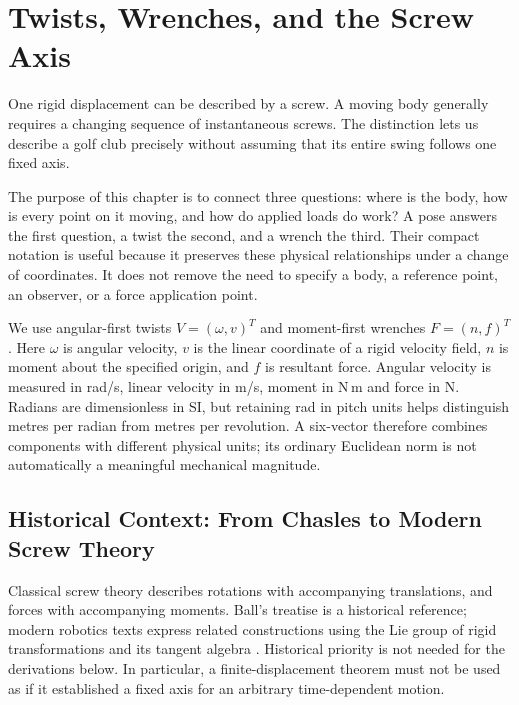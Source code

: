 \chapter{Twists, Wrenches, and the Screw Axis}
\label{ch:screw_axes}
\label{laymans:context_box}

One rigid displacement can be described by a screw. A moving body generally requires a changing sequence of instantaneous screws. The distinction lets us describe a golf club precisely without assuming that its entire swing follows one fixed axis.

The purpose of this chapter is to connect three questions: where is the body, how is every point on it moving, and how do applied loads do work? A pose answers the first question, a twist the second, and a wrench the third. Their compact notation is useful because it preserves these physical relationships under a change of coordinates. It does not remove the need to specify a body, a reference point, an observer, or a force application point.

We use angular-first twists $V=(\omega,v)^T$ and moment-first wrenches $F=(n,f)^T$. Here $\omega$ is angular velocity, $v$ is the linear coordinate of a rigid velocity field, $n$ is moment about the specified origin, and $f$ is resultant force. Angular velocity is measured in rad/s, linear velocity in m/s, moment in N\,m and force in N. Radians are dimensionless in SI, but retaining rad in pitch units helps distinguish metres per radian from metres per revolution. A six-vector therefore combines components with different physical units; its ordinary Euclidean norm is not automatically a meaningful mechanical magnitude.

\section{Historical Context: From Chasles to Modern Screw Theory}
\label{sec:historical_context_screws}
\label{princ:twist_wrench_convention}

Classical screw theory describes rotations with accompanying translations, and forces with accompanying moments. Ball's treatise \cite{ball1900} is a historical reference; modern robotics texts express related constructions using the Lie group of rigid transformations and its tangent algebra \cite{Murray1994,Lynch2017}. Historical priority is not needed for the derivations below. In particular, a finite-displacement theorem must not be used as if it established a fixed axis for an arbitrary time-dependent motion.

